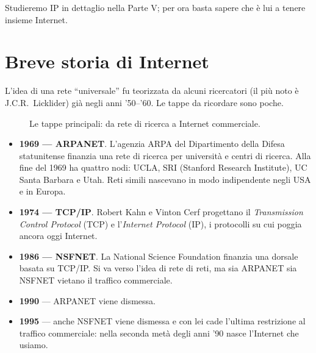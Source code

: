 Studieremo IP in dettaglio nella Parte V; per ora basta sapere che è lui a tenere insieme Internet.

\section{Breve storia di Internet}

L'idea di una rete ``universale'' fu teorizzata da alcuni ricercatori (il più noto è
J.C.R.~Licklider) già negli anni '50--'60. Le tappe da ricordare sono poche.

\begin{figure}[H]
\centering
{}
\caption{Le tappe principali: da rete di ricerca a Internet commerciale.}
\end{figure}

\begin{itemize}
    \item \textbf{1969 --- ARPANET}. L'agenzia ARPA del Dipartimento della Difesa statunitense finanzia
          una rete di ricerca per università e centri di ricerca. Alla fine del 1969 ha quattro nodi:
          UCLA, SRI (Stanford Research Institute), UC Santa Barbara e Utah. Reti simili nascevano in modo
          indipendente negli USA e in Europa.
    \item \textbf{1974 --- TCP/IP}. Robert Kahn e Vinton Cerf progettano il \emph{Transmission Control
          Protocol} (TCP) e l'\emph{Internet Protocol} (IP), i protocolli su cui poggia ancora oggi Internet.
    \item \textbf{1986 --- NSFNET}. La National Science Foundation finanzia una dorsale basata su TCP/IP.
          Si va verso l'idea di rete di reti, ma sia ARPANET sia NSFNET vietano il traffico commerciale.
    \item \textbf{1990} --- ARPANET viene dismessa.
    \item \textbf{1995} --- anche NSFNET viene dismessa e con lei cade l'ultima restrizione al traffico
          commerciale: nella seconda metà degli anni '90 nasce l'Internet che usiamo.
\end{itemize}

